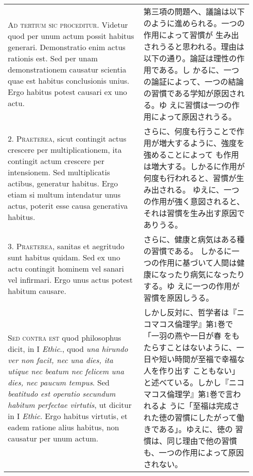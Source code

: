 \documentclass[10pt]{jsarticle} %
\begin{document}
\begin{longtable}{p{21em}p{21em}}


{\scshape Ad tertium sic proceditur}. Videtur quod per unum actum
possit habitus generari. Demonstratio enim actus rationis est. Sed per
unam demonstrationem causatur scientia quae est habitus conclusionis
unius. Ergo habitus potest causari ex uno actu.


&

第三項の問題へ、議論は以下のように進められる。一つの作用によって習慣が
生み出されうると思われる。理由は以下の通り。論証は理性の作用である。し
かるに、一つの論証によって、一つの結論の習慣である学知が原因される。ゆ
えに習慣は一つの作用によって原因されうる。

\\



2. {\scshape Praeterea}, sicut contingit actus crescere per multiplicationem, ita
contingit actum crescere per intensionem. Sed multiplicatis actibus,
generatur habitus. Ergo etiam si multum intendatur unus actus, poterit
esse causa generativa habitus.

&

さらに、何度も行うことで作用が増大するように、強度を強めることによって
も作用は増大する。しかるに作用が何度も行われると、習慣が生み出される。
ゆえに、一つの作用が強く意図されると、それは習慣を生み出す原因でありうる。

\\


3. {\scshape Praeterea}, sanitas et aegritudo sunt habitus quidam. Sed ex uno actu
contingit hominem vel sanari vel infirmari. Ergo unus actus potest
habitum causare.

&

さらに、健康と病気はある種の習慣である。
しかるに一つの作用に基づいて人間は健康になったり病気になったりする。ゆ
 えに一つの作用が習慣を原因しうる。

\\



{\scshape Sed contra est} quod philosophus dicit, in I {\itshape Ethic}., quod
{\itshape una hirundo ver non facit, nec una dies, ita utique nec beatum nec
felicem una dies, nec paucum tempus}. Sed {\itshape beatitudo est operatio
secundum habitum perfectae virtutis}, ut dicitur in I {\itshape Ethic}. Ergo
habitus virtutis, et eadem ratione alius habitus, non causatur per
unum actum.


&

しかし反対に、哲学者は『ニコマコス倫理学』第1巻で「一羽の燕や一日が春
 をもたらすことはないように、一日や短い時間が至福で幸福な人を作り出す
 こともない」と述べている。しかし『ニコマコス倫理学』第1巻で言われるよ
 うに「至福は完成された徳の習慣にしたがって働きである」。ゆえに、徳の
 習慣は、同じ理由で他の習慣も、一つの作用によって原因されない。


\end{longtable}
\end{document}
